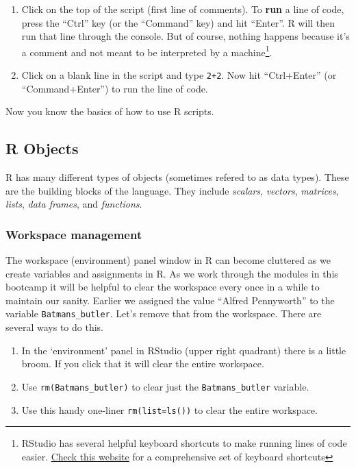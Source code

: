 \documentclass[]{article}
\providecommand{\tightlist}{%
  \setlength{\itemsep}{0pt}\setlength{\parskip}{0pt}}
\let\rmarkdownfootnote\footnote%
\def\footnote{\protect\rmarkdownfootnote}
\begin{document}
\begin{enumerate}
\def\labelenumi{\arabic{enumi}.}
\item
  Click on the top of the script (first line of comments). To
  \textbf{run} a line of code, press the ``Ctrl'' key (or the
  ``Command'' key) and hit ``Enter''. R will then run that line through
  the console. But of course, nothing happens because it's a comment and
  not meant to be interpreted by a machine\footnote{RStudio has several
    helpful keyboard shortcuts to make running lines of code easier.
    \href{https://support.rstudio.com/hc/en-us/articles/200711853-Keyboard-Shortcuts}{Check
    this website} for a comprehensive set of keyboard shortcuts}.
\item
  Click on a blank line in the script and type \texttt{2+2}. Now hit
  ``Ctrl+Enter'' (or ``Command+Enter'') to run the line of code.
\end{enumerate}

Now you know the basics of how to use R scripts.

\subsection{R Objects}\label{r-objects}

R has many different types of objects (sometimes refered to as data
types). These are the building blocks of the language. They include
\emph{scalars}, \emph{vectors}, \emph{matrices}, \emph{lists},
\emph{data frames}, and \emph{functions}.

\subsubsection{Workspace management}\label{workspace-management}

The workspace (environment) panel window in R can become cluttered as we
create variables and assignments in R. As we work through the modules in
this bootcamp it will be helpful to clear the workspace every once in a
while to maintain our sanity. Earlier we assigned the value ``Alfred
Pennyworth'' to the variable \texttt{Batmans\_butler}. Let's remove that
from the workspace. There are several ways to do this.

\begin{enumerate}
\def\labelenumi{\arabic{enumi}.}
\tightlist
\item
  In the `environment' panel in RStudio (upper right quadrant) there is
  a little broom. If you click that it will clear the entire
  workspace.\\
\item
  Use \texttt{rm(Batmans\_butler)} to clear just the
  \texttt{Batmans\_butler} variable.
\item
  Use this handy one-liner \texttt{rm(list=ls())} to clear the entire
  workspace.
\end{enumerate}
\end{document}
